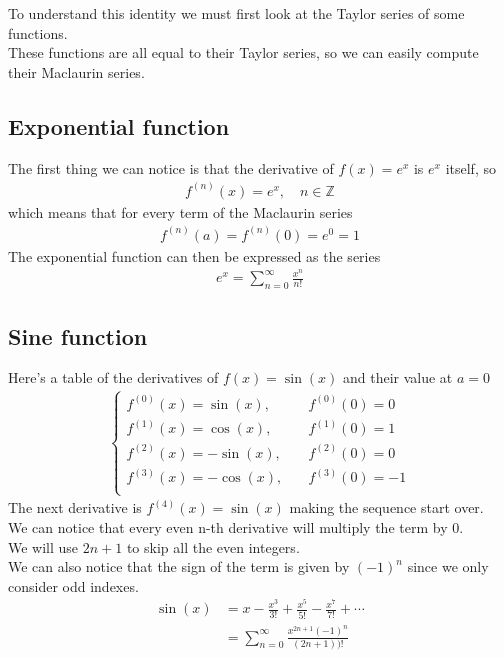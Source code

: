 \documentclass{article}
\begin{document}
To understand this identity we must first look at the Taylor series of some functions.
\\
These functions are all equal to their Taylor series, so we can easily compute their Maclaurin series.

\subsection{Exponential function}

The first thing we can notice is that the derivative of \(f(x)=e^x\) is \(e^x\) itself, so
\begin{align*}
	f^{(n)}(x)=e^x,
	\quad n\in\mathds{Z}
\end{align*}
which means that for every term of the Maclaurin series
\begin{align*}
	f^{(n)}(a)=f^{(n)}(0)=e^0=1
\end{align*}
The exponential function can then be expressed as the series
\begin{align*}
	e^x=\sum_{n=0}^{\infty}\frac{x^n}{n!}
\end{align*}

\pagebreak

\subsection{Sine function}

Here's a table of the derivatives of \(f(x)=\sin(x)\) and their value at \(a=0\)
\begin{align*}
	\begin{cases}
		f^{(0)}(x)=\sin(x), \quad &f^{(0)}(0)=0 \\
		f^{(1)}(x)=\cos(x), \quad &f^{(1)}(0)=1 \\
		f^{(2)}(x)=-\sin(x),\quad &f^{(2)}(0)=0 \\
		f^{(3)}(x)=-\cos(x),\quad &f^{(3)}(0)=-1\\
	\end{cases}
\end{align*}
The next derivative is \(f^{(4)}(x)=\sin(x)\) making the sequence start over.
\\
We can notice that every even n-th derivative will multiply the term by \(0\).
\\
We will use \(2n+1\) to skip all the even integers.
\\
We can also notice that the sign of the term is given by \((-1)^n\) since we only consider odd indexes.
\begin{align*}
	\sin(x)&=x-\frac{x^3}{3!}+\frac{x^5}{5!}-\frac{x^7}{7!}+\cdots
	\\
	&=\sum_{n=0}^{\infty}\frac{x^{2n+1}(-1)^n}{(2n+1))!}
\end{align*}
\end{document}
